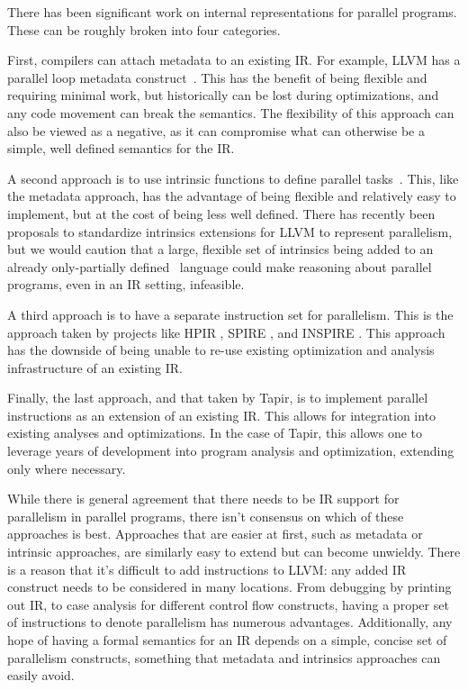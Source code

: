 \documentclass[sigconf]{acmart}
\begin{document}
There has been significant work on internal representations for parallel
programs. These can be roughly broken into four categories.

First, compilers can attach metadata to an existing IR. For example, LLVM has a
parallel loop metadata construct~\cite{llvmref}. This has the benefit of being
flexible and requiring minimal work, but historically can be lost during
optimizations, and any code movement can break the semantics. The flexibility
of this approach can also be viewed as a negative, as it can compromise
what can otherwise be a simple, well defined semantics for the IR.

A second approach is to use intrinsic functions to define parallel tasks~\cite{ares}.
This, like the metadata approach, has the advantage of being
flexible and relatively easy to implement, but at the cost of being less well
defined. There has recently been proposals to standardize intrinsics extensions
for LLVM to represent parallelism, but we would caution that a large, flexible
set of intrinsics being added to an already only-partially defined~\cite{verillvm} language could make reasoning about parallel programs, even
in an IR setting, infeasible.

A third approach is to have a separate instruction set for parallelism. This is
the approach taken by projects like HPIR \cite{zhao2011intermediate}, SPIRE
\cite{khaldi2012spire}, and INSPIRE \cite{jordan2013inspire}. This approach has
the downside of being unable to re-use existing optimization and analysis
infrastructure of an existing IR.

Finally, the last approach, and that taken by Tapir, is to implement parallel
instructions as an extension of an existing IR. This allows for integration
into existing analyses and optimizations. In the case of Tapir, this allows one
to leverage years of development into program analysis and optimization,
extending only where necessary.

While there is general agreement that there needs to be IR support for
parallelism in parallel programs, there isn't consensus on which of these
approaches is best. Approaches that are easier at first, such as metadata
or intrinsic approaches, are similarly easy to extend but can become unwieldy. There is
a reason that it's difficult to add instructions to LLVM: any added IR
construct needs to be considered in many locations. From debugging by printing
out IR, to case analysis for different control flow constructs, having
a proper set of instructions to denote parallelism has numerous advantages.
Additionally, any hope of having a formal semantics for an IR depends on a
simple, concise set of parallelism constructs, something that metadata and
intrinsics approaches can easily avoid.
\end{document}

